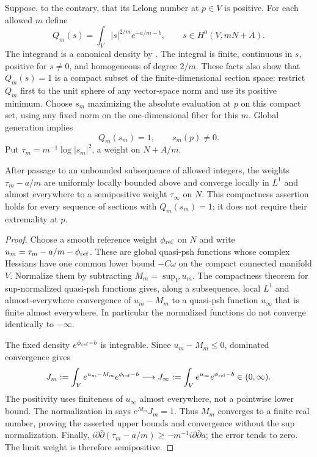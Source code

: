 Suppose, to the contrary, that its Lelong number at $p\in V$ is
positive.  For each allowed $m$ define
\begin{equation}\label{eq:extremal-gauge}
 Q_m(s)=\int_V |s|^{2/m}e^{-a/m-b},
 \qquad s\in H^0(V,mN+A).
\end{equation}
The integrand is a canonical density by .
The integral is finite, continuous in $s$, positive for $s\ne0$, and
homogeneous of degree $2/m$.  These facts also show that $Q_m(s)=1$ is
a compact subset of the finite-dimensional section space: restrict
$Q_m$ first to the unit sphere of any vector-space norm and use its
positive minimum.  Choose $s_m$ maximizing the absolute evaluation at
$p$ on this compact set, using any fixed norm on the one-dimensional
fiber for this $m$.  Global generation implies
\begin{equation}\label{eq:extremal-value}
 Q_m(s_m)=1,\qquad s_m(p)\ne0.
\end{equation}
Put $\tau_m=m^{-1}\log|s_m|^2$, a weight on $N+A/m$.

\begin{claim}\label{clm:extremal-compactness}
After passage to an unbounded subsequence of allowed integers, the
weights $\tau_m-a/m$ are uniformly locally bounded above and converge
locally in $L^1$ and almost everywhere to a semipositive weight
$\tau_\infty$ on $N$. This compactness assertion holds for every
sequence of sections with $Q_m(s_m)=1$; it does not require their
extremality at $p$.
\end{claim}

\begin{proof}
Choose a smooth reference weight $\phi_{\rm ref}$ on $N$ and write
$u_m=\tau_m-a/m-\phi_{\rm ref}$.  These are global quasi-psh functions
whose complex Hessians have one common lower bound $-C\omega$ on the
compact connected manifold $V$.  Normalize them by subtracting
$M_m=\sup_Vu_m$.  The compactness theorem for sup-normalized quasi-psh
functions \cite[Proposition~2.7]{GuedjZeriahi2005} gives, along a
subsequence, local $L^1$ and almost-everywhere
convergence of $u_m-M_m$ to a quasi-psh function $u_\infty$ that is
finite almost everywhere.  In particular the normalized functions do
not converge identically to $-\infty$.

The fixed density $e^{\phi_{\rm ref}-b}$ is integrable.  Since
$u_m-M_m\le0$, dominated convergence gives
\[
 J_m:=\int_V e^{u_m-M_m}e^{\phi_{\rm ref}-b}
 \longrightarrow
 J_\infty:=\int_V e^{u_\infty}e^{\phi_{\rm ref}-b}\in(0,\infty).
\]
The positivity uses finiteness of $u_\infty$ almost everywhere, not a
pointwise lower bound.  The normalization in
 says $e^{M_m}J_m=1$.  Thus $M_m$ converges to
a finite real number, proving the asserted upper bounds and
convergence without the sup normalization.  Finally,
$i\partial\bar\partial(\tau_m-a/m)\ge
-m^{-1}i\partial\bar\partial a$; the error tends to zero.  The limit
weight is therefore semipositive.
\end{proof}

